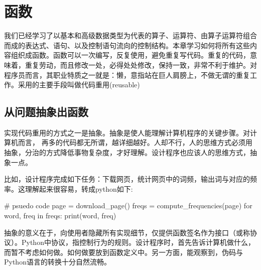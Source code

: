 \chapter{函数}
我们已经学习了以基本和高级数据类型为代表的算子、运算符、由算子运算符组合而成的表达式、语句、以及控制语句流向的控制结构。本章学习如何将所有这些内容组织成函数。函数可以一次编写，反复使用，避免重复写代码。重复的代码，意味着，重复劳动，而且修改一处，必得处处修改，保持一致，非常不利于维护。对程序员而言，其职业特质之一就是：懒，意指站在巨人肩膀上，不做无谓的重复工作。采用的主要手段叫做代码重用(reusable)
\section{从问题抽象出函数}
实现代码重用的方式之一是抽象。抽象是使人能理解计算机程序的关键步骤。对计算机而言， 再多的代码都无所谓，越详细越好。人却不行，人的思维方式必须用抽象，分治的方式降低事物复杂度，才好理解。设计程序也应该人的思维方式，抽象一点。

比如，设计程序完成如下任务：下载网页，统计网页中的词频，输出词与对应的频率。这理解起来很容易，转成python如下:
\begin{python}
  # psuedo code
  page = download_page()
  freqs = compute_frequencies(page)
  for word, freq in freqs:
      print(word, freq)
\end{python}
抽象的意义在于，向使用者隐藏所有实现细节，仅提供函数签名作为接口（或称协议）。Python中协议，指控制行为的规则。设计程序时，首先告诉计算机做什么，而暂不考虑如何做。如何做要放到函数定义中。另一方面，能观察到，伪码与Python语言的转换十分自然流畅。
